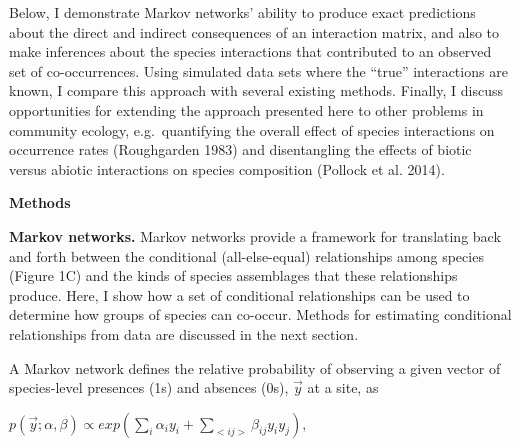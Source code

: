 \documentclass[12pt,]{article}
\begin{document}
\begin{spacing}{1.9}
\begin{flushleft}
Below, I demonstrate Markov networks' ability to produce exact
predictions about the direct and indirect consequences of an interaction
matrix, and also to make inferences about the species interactions that
contributed to an observed set of co-occurrences. Using simulated data
sets where the ``true'' interactions are known, I compare this approach
with several existing methods. Finally, I discuss opportunities for
extending the approach presented here to other problems in community
ecology, e.g.~quantifying the overall effect of species interactions on
occurrence rates (Roughgarden 1983) and disentangling the effects of
biotic versus abiotic interactions on species composition (Pollock et
al. 2014).

\noindent\textbf{Methods}

\noindent
\textbf{Markov networks.} Markov networks provide a framework for
translating back and forth between the conditional (all-else-equal)
relationships among species (Figure 1C) and the kinds of species
assemblages that these relationships produce. Here, I show how a set of
conditional relationships can be used to determine how groups of species
can co-occur. Methods for estimating conditional relationships from data
are discussed in the next section.

A Markov network defines the relative probability of observing a given
vector of species-level presences (1s) and absences (0s), \(\vec{y}\) at
a site, as

\centering

\(\displaystyle{p(\vec{y}; \alpha, \beta) \propto exp(\sum_{i}\alpha_i y_i + \sum_{<ij>}\beta_{ij}y_i y_j),}\)

\raggedright
\setlength{\parindent}{2em}


\end{flushleft}
\end{spacing}
\end{document}
